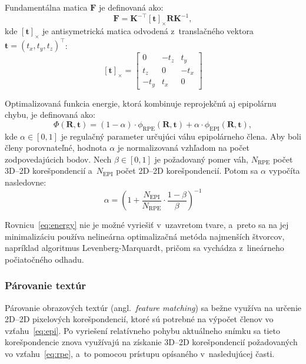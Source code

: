       Fundamentálna matica $\mathbf{F}$ je definovaná ako:
      \begin{equation}
      \mathbf{F} = \mathbf{K}^{-\top} {[\mathbf{t}]}_{\times} \mathbf{R} \mathbf{K}^{-1},
      \label{eq:fundamental}
      \end{equation}
      kde ${[\mathbf{t}]}_{\times}$ je antisymetrická matica odvodená z~translačného vektora $\mathbf{t} = {(t_x, t_y, t_z)}^{\top}$:
      \begin{equation}
      {[\mathbf{t}]}_{\times} =
      \begin{bmatrix}
      0 & -t_z & t_y \\
      t_z & 0 & -t_x \\
      -t_y & t_x & 0
      \end{bmatrix}
      \label{eq:skew}
      \end{equation}

      Optimalizovaná funkcia energie, ktorá kombinuje reprojekčnú aj epipolárnu chybu, je definovaná ako:
      \begin{equation}
      \Phi(\mathbf{R}, \mathbf{t}) = (1 - \alpha) \cdot \phi_{\text{RPE}}(\mathbf{R}, \mathbf{t}) + \alpha \cdot \phi_{\text{EPI}}(\mathbf{R}, \mathbf{t}),
      \label{eq:energy}
      \end{equation}
      kde $\alpha \in [0, 1]$ je regulačný parameter určujúci váhu epipolárneho člena. Aby boli členy porovnateľné, hodnota $\alpha$ je normalizovaná vzhľadom na počet zodpovedajúcich bodov. Nech $\beta \in [0, 1]$ je požadovaný pomer váh, $N_{\text{RPE}}$ počet 3D--2D korešpondencií a~$N_{\text{EPI}}$ počet 2D--2D korešpondencií. Potom sa $\alpha$ vypočíta nasledovne:
      \begin{equation}
      \alpha = {\left( 1 + \frac{N_{\text{EPI}}}{N_{\text{RPE}}} \cdot \frac{1 - \beta}{\beta} \right)}^{-1}
      \label{eq:alpha}
      \end{equation}

      Rovnicu~\eqref{eq:energy} nie je možné vyriešiť v~uzavretom tvare, a~preto sa na jej minimalizáciu používa nelineárna optimalizačná metóda najmenších štvorcov, napríklad algoritmus Levenberg-Marquardt, pričom sa vychádza z~lineárneho počiatočného odhadu.

    \subsubsection{Párovanie textúr}

      Párovanie obrazových textúr (angl.\ \emph{feature matching}) sa bežne využíva na určenie 2D--2D pixelových korešpondencií, ktoré sú potrebné na výpočet členov vo vzťahu~\eqref{eq:epi}. Po vyriešení relatívneho pohybu aktuálneho snímku sa tieto korešpondencie znova využívajú na získanie 3D--2D korešpondencií požadovaných vo vzťahu~\eqref{eq:rpe}, a~to pomocou prístupu opísaného v~nasledujúcej časti.

